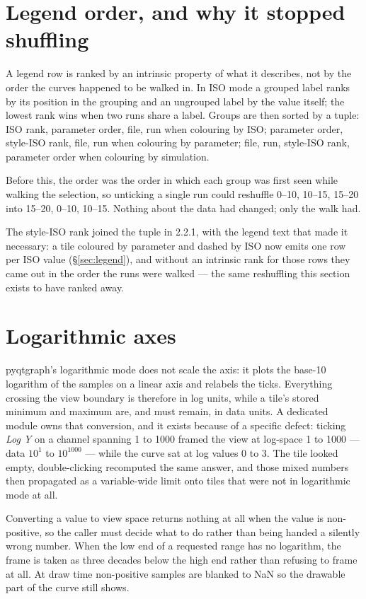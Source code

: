 \documentclass[11pt,a4paper,oneside]{report}
\newcommand{\appver}{2.2.1}
\begin{document}
\section{Legend order, and why it stopped shuffling}

A legend row is ranked by an intrinsic property of what it describes, not by the
order the curves happened to be walked in. In ISO mode a grouped label ranks by
its position in the grouping and an ungrouped label by the value itself; the
lowest rank wins when two runs share a label. Groups are then sorted by a tuple:
ISO rank, parameter order, file, run when colouring by ISO; parameter order,
style-ISO rank, file, run when colouring by parameter; file, run, style-ISO
rank, parameter order when colouring by simulation.

Before this, the order was the order in which each group was first seen while
walking the selection, so unticking a single run could reshuffle 0--10, 10--15,
15--20 into 15--20, 0--10, 10--15. Nothing about the data had changed; only the
walk had.

The style-ISO rank joined the tuple in \appver, with the legend text that made
it necessary: a tile coloured by parameter and dashed by ISO now emits one row
per ISO value (\S\ref{sec:legend}), and without an intrinsic rank for those rows
they came out in the order the runs were walked --- the same reshuffling this
section exists to have ranked away.

\section{Logarithmic axes}

pyqtgraph's logarithmic mode does not scale the axis: it plots the base-10
logarithm of the samples on a linear axis and relabels the ticks. Everything
crossing the view boundary is therefore in log units, while a tile's stored
minimum and maximum are, and must remain, in data units. A dedicated module owns
that conversion, and it exists because of a specific defect: ticking \emph{Log
Y} on a channel spanning 1 to 1000 framed the view at log-space 1 to 1000 ---
data $10^1$ to $10^{1000}$ --- while the curve sat at log values 0 to 3. The
tile looked empty, double-clicking recomputed the same answer, and those mixed
numbers then propagated as a variable-wide limit onto tiles that were not in
logarithmic mode at all.

Converting a value to view space returns nothing at all when the value is
non-positive, so the caller must decide what to do rather than being handed a
silently wrong number. When the low end of a requested range has no logarithm,
the frame is taken as three decades below the high end rather than refusing to
frame at all. At draw time non-positive samples are blanked to NaN so the
drawable part of the curve still shows.
\end{document}
